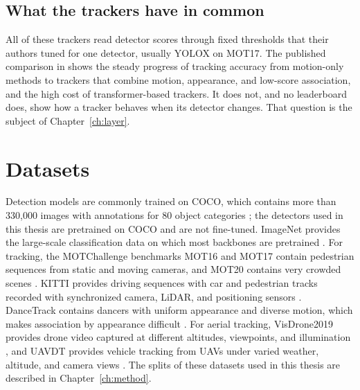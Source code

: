 \subsection{What the trackers have in common}
All of these trackers read detector scores through fixed thresholds that their authors tuned for one detector, usually YOLOX \cite{ge2021yolox} on MOT17. The published comparison in \cite{ismail2026realtime} shows the steady progress of tracking accuracy from motion-only methods to trackers that combine motion, appearance, and low-score association, and the high cost of transformer-based trackers. It does not, and no leaderboard does, show how a tracker behaves when its detector changes. That question is the subject of Chapter~\ref{ch:layer}.

\section{Datasets}\label{sec:bg-datasets}
Detection models are commonly trained on COCO, which contains more than 330,000 images with annotations for 80 object categories \cite{lin2014coco}; the detectors used in this thesis are pretrained on COCO and are not fine-tuned. ImageNet provides the large-scale classification data on which most backbones are pretrained \cite{russakovsky2015imagenet}. For tracking, the MOTChallenge benchmarks MOT16 and MOT17 \cite{milan2016mot16,dendorfer2021motchallenge} contain pedestrian sequences from static and moving cameras, and MOT20 contains very crowded scenes \cite{dendorfer2020mot20}. KITTI provides driving sequences with car and pedestrian tracks recorded with synchronized camera, LiDAR, and positioning sensors \cite{geiger2012kitti}. DanceTrack contains dancers with uniform appearance and diverse motion, which makes association by appearance difficult \cite{sun2022dancetrack}. For aerial tracking, VisDrone2019 provides drone video captured at different altitudes, viewpoints, and illumination \cite{zhu2022visdrone}, and UAVDT provides vehicle tracking from UAVs under varied weather, altitude, and camera views \cite{du2018uavdt}. The splits of these datasets used in this thesis are described in Chapter~\ref{ch:method}.

